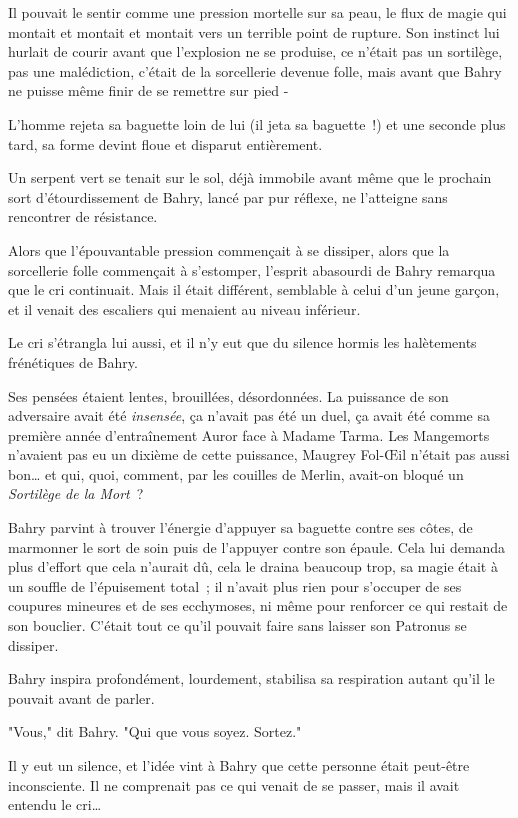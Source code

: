 Il pouvait le sentir comme une pression mortelle sur sa peau, le flux de magie qui montait et montait et montait vers un terrible point de rupture. Son instinct lui hurlait de courir avant que l'explosion ne se produise, ce n'était pas un sortilège, pas une malédiction, c'était de la sorcellerie devenue folle, mais avant que Bahry ne puisse même finir de se remettre sur pied -

L'homme rejeta sa baguette loin de lui (il jeta sa baguette~!) et une seconde plus tard, sa forme devint floue et disparut entièrement.

Un serpent vert se tenait sur le sol, déjà immobile avant même que le prochain sort d'étourdissement de Bahry, lancé par pur réflexe, ne l'atteigne sans rencontrer de résistance.

Alors que l'épouvantable pression commençait à se dissiper, alors que la sorcellerie folle commençait à s'estomper, l'esprit abasourdi de Bahry remarqua que le cri continuait. Mais il était différent, semblable à celui d'un jeune garçon, et il venait des escaliers qui menaient au niveau inférieur.

Le cri s'étrangla lui aussi, et il n'y eut que du silence hormis les halètements frénétiques de Bahry.

Ses pensées étaient lentes, brouillées, désordonnées. La puissance de son adversaire avait été \emph{insensée}, ça n'avait pas été un duel, ça avait été comme sa première année d'entraînement Auror face à Madame Tarma. Les Mangemorts n'avaient pas eu un dixième de cette puissance, Maugrey Fol-Œil n'était pas aussi bon… et qui, quoi, comment, par les couilles de Merlin, avait-on bloqué un \emph{Sortilège de la Mort}~?

Bahry parvint à trouver l'énergie d'appuyer sa baguette contre ses côtes, de marmonner le sort de soin puis de l'appuyer contre son épaule. Cela lui demanda plus d'effort que cela n'aurait dû, cela le draina beaucoup trop, sa magie était à un souffle de l'épuisement total~; il n'avait plus rien pour s'occuper de ses coupures mineures et de ses ecchymoses, ni même pour renforcer ce qui restait de son bouclier. C'était tout ce qu'il pouvait faire sans laisser son Patronus se dissiper.

Bahry inspira profondément, lourdement, stabilisa sa respiration autant qu'il le pouvait avant de parler.

"Vous," dit Bahry. "Qui que vous soyez. Sortez."

Il y eut un silence, et l'idée vint à Bahry que cette personne était peut-être inconsciente. Il ne comprenait pas ce qui venait de se passer, mais il avait entendu le cri…

